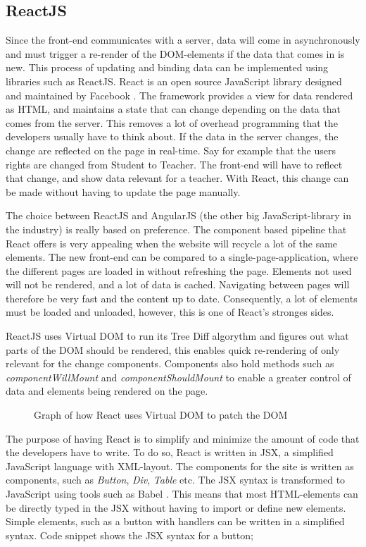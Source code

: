 \subsection{ReactJS}
Since the front-end communicates with a server, data will come in asynchronously and must trigger a re-render of the DOM-elements if the data that comes in is new. This process of updating and binding data can be implemented using libraries such as ReactJS. React is an open source JavaScript library designed and maintained by Facebook . The framework provides a view for data rendered as HTML, and maintains a state that can change depending on the data that comes from the server. This removes a lot of overhead programming that the developers usually have to think about. If the data in the server changes, the change are reflected on the page in real-time. Say for example that the users rights are changed from Student to Teacher. The front-end will have to reflect that change, and show data relevant for a teacher. With React, this change can be made without having to update the page manually. 


The choice between ReactJS and AngularJS (the other big JavaScript-library in the industry) is really based on preference. The component based pipeline that React offers is very appealing when the website will recycle a lot of the same elements. The new front-end can be compared to a single-page-application, where the different pages are loaded in without refreshing the page. Elements not used will not be rendered, and a lot of data is cached. Navigating between pages will therefore be very fast and the content up to date. Consequently, a lot of elements must be loaded and unloaded, however, this is one of React's stronges sides. 

ReactJS uses Virtual DOM to run its Tree Diff algorythm and figures out what parts of the DOM should be rendered, this enables quick re-rendering of only relevant for the change components. Components also hold methods such as \emph{componentWillMount} and \emph{componentShouldMount} to enable a greater control of data and elements being rendered on the page.

\begin{figure}[h]
\centering
{}
\caption{Graph of how React uses Virtual DOM to patch the DOM}
\end{figure}


The purpose of having React is to simplify and minimize the amount of code that the developers have to write. To do so, React is written in JSX, a simplified JavaScript language with XML-layout. The components for the site is written as components, such as \emph{Button}, \emph{Div}, \emph{Table} etc. The JSX syntax is transformed to JavaScript using tools such as Babel . This means that most HTML-elements can be directly typed in the JSX without having to import or define new elements. Simple elements, such as a button with handlers can be written in a simplified syntax. Code snippet  shows the JSX syntax for a button;

